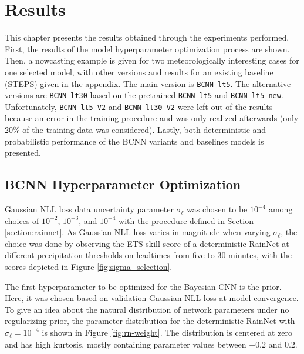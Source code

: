\chapter{Results}
\label{chapter:results}

This chapter presents the results obtained through the experiments performed. First, the results of the model hyperparameter optimization process are shown. Then, a nowcasting example is given for two meteorologically interesting cases for one selected model, with other versions and results for an existing baseline (STEPS) given in the appendix. The main version is \texttt{BCNN lt5}. The alternative versions are \texttt{BCNN lt30} based on the pretrained \texttt{BCNN lt5} and \texttt{BCNN lt5 new}. Unfortunately, \texttt{BCNN lt5 V2} and \texttt{BCNN lt30 V2} were left out of the results because an error in the training procedure and was only realized afterwards (only 20\% of the training data was considered). Lastly, both deterministic and probabilistic performance of the BCNN variants and baselines models is presented. 

\section{BCNN Hyperparameter Optimization}
Gaussian NLL loss data uncertainty parameter $\sigma_\ell$ was chosen to be $10^{-4}$ among choices of $10^{-2}$, $10^{-3}$, and $10^{-4}$ with the procedure defined in Section \ref{section:rainnet}.
As Gaussian NLL loss varies in magnitude when varying $\sigma_\ell$, the choice was done by observing the ETS skill score of a deterministic RainNet at different precipitation thresholds on leadtimes from five to 30 minutes, with the scores depicted in Figure \ref{fig:sigma_selection}. %

The first hyperparameter to be optimized for the Bayesian CNN is the prior. Here, it was chosen based on validation Gaussian NLL loss at model convergence. To give an idea about the natural distribution of network parameters under no regularizing prior, the parameter distribution for the deterministic RainNet with $\sigma_\ell = 10^{-4}$ is shown in Figure \ref{fig:rn-weight}. The distribution is centered at zero and has high kurtosis, mostly containing parameter values between  $-0.2$ and $0.2$. 

